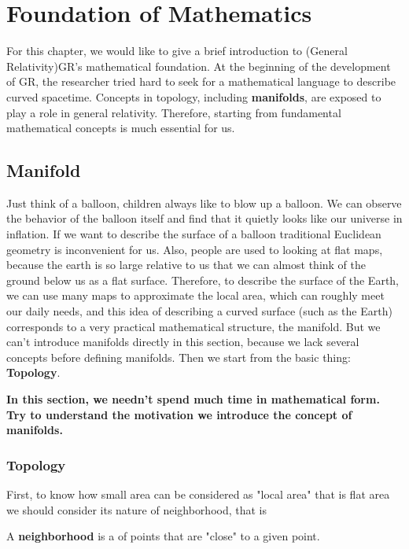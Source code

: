 \newpage

\mainmatter
{}
\chapter{Foundation of Mathematics}

For this chapter, we would like to give a brief introduction to (General Relativity)GR's mathematical foundation. At the beginning of the development of GR, the researcher tried hard to seek for a mathematical language to describe curved spacetime. Concepts in topology, including \textbf{manifolds}, are exposed to play a role in general relativity. Therefore, starting from fundamental mathematical concepts is much essential for us.

\section{Manifold}
Just think of a balloon, children always like to blow up a balloon. We can observe the behavior of the balloon itself and find that it quietly looks like our universe in inflation. If we want to describe the surface of a balloon traditional Euclidean geometry is inconvenient for us. Also, people are used to looking at flat maps, because the earth is so large relative to us that we can almost think of the ground below us as a flat surface. Therefore, to describe the surface of the Earth, we can use many maps to approximate the local area, which can roughly meet our daily needs, and this idea of describing a curved surface (such as the Earth) corresponds to a very practical mathematical structure, the manifold. But we can't introduce manifolds directly in this section, because we lack several concepts before defining manifolds. Then we start from the basic thing: \textbf{Topology}. 

\textbf{In this section, we needn't spend much time in mathematical form. Try to understand the motivation we introduce the concept of manifolds.}

\subsection{Topology}

First, to know how small area can be considered as "local area" that is flat area we should consider its nature of neighborhood, that is 

\begin{tcolorbox}[title=\textbf{Neighborbood},colback=SeaGreen!10!CornflowerBlue!10,colframe=RoyalPurple!55!Aquamarine!100!]
    A \textbf{neighborhood} is a of points that are "close" to a given point. 
\end{tcolorbox}

